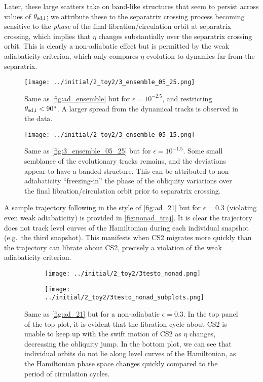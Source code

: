 \documentclass[
        fleqn,
        usenatbib,
        referee,
    ]{mnras}
\begin{document}
Later, these large scatters take on band-like structures that seem to persist
across values of $\theta_{\rm sd, i}$; we attribute these to the separatrix
crossing process becoming sensitive to the \emph{phase} of the final
libration/circulation orbit at separatrix crossing, which implies that $\eta$
changes substantially over the separatrix crossing orbit. This is clearly a
non-adiabatic effect but is permitted by the weak adiabaticity criterion,
which only compares $\eta$ evolution to dynamics far from the separatrix.
\begin{figure}
    \centering
    \texttt{[image: ../initial/2\_toy2/3\_ensemble\_05\_25.png]}
    \caption{Same as \autoref{fig:ad_ensemble} but for $\epsilon = 10^{-2.5}$,
    and restricting $\theta_{\rm sd, i} < 90^\circ$. A larger spread from the
    dynamical tracks is observed in the data.}\label{fig:3_ensemble_05_25}
\end{figure}
\begin{figure}
    \centering
    \texttt{[image: ../initial/2\_toy2/3\_ensemble\_05\_15.png]}
    \caption{Same as \autoref{fig:3_ensemble_05_25} but for $\epsilon =
    10^{-1.5}$. Some small semblance of the evolutionary tracks remains, and the
    deviations appear to have a banded structure. This can be attributed to
    non-adiabaticity ``freezing-in'' the phase of the obliquity variations over
    the final libration/circulation orbit prior to separatrix
    crossing.}\label{fig:3_ensemble_05_15}
\end{figure}

A sample trajectory following in the style of \autoref{fig:ad_21} but for
$\epsilon = 0.3$ (violating even weak adiabaticity) is provided in
\autoref{fig:nonad_traj}. It is clear the trajectory does not track level curves
of the Hamiltonian during each individual snapshot (e.g.\ the third snapshot).
This manifests when CS2 migrates more quickly than the trajectory can librate
about CS2, precisely a violation of the weak adiabaticity criterion.
\begin{figure}
    \centering
    \begin{subfigure}{\columnwidth}
        \centering
        \texttt{[image: ../initial/2\_toy2/3testo\_nonad.png]}
    \end{subfigure}
    \begin{subfigure}{\columnwidth}
        \centering
        \texttt{[image: ../initial/2\_toy2/3testo\_nonad\_subplots.png]}
    \end{subfigure}
    \caption{Same as \autoref{fig:ad_21} but for a non-adiabatic $\epsilon =
    0.3$. In the top panel of the top plot, it is evident that the libration
    cycle about CS2 is unable to keep up with the swift motion of CS2 as $\eta$
    changes, decreasing the obliquity jump. In the bottom plot, we can see that
    individual orbits do not lie along level curves of the Hamiltonian, as the
    Hamiltonian phase space changes quickly compared to the period of
    circulation cycles.}\label{fig:nonad_traj}
\end{figure}
\end{document}
